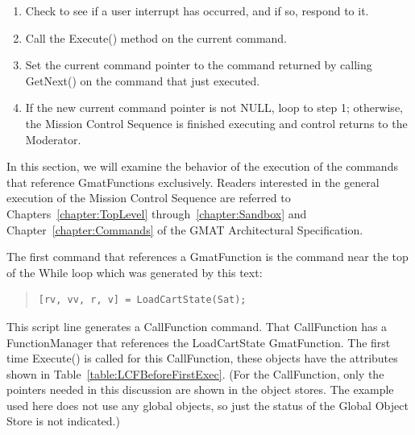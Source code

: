 \begin{enumerate}
\item Check to see if a user interrupt has occurred, and if so, respond to it.
\item Call the Execute() method on the current command.
\item Set the current command pointer to the command returned by calling GetNext() on the command
that just executed.
\item If the new current command pointer is not NULL, loop to step 1; otherwise, the Mission Control
Sequence is finished executing and control returns to the Moderator.
\end{enumerate}

In this section, we will examine the behavior of the execution of the commands that reference
GmatFunctions exclusively.  Readers interested in the general execution of the Mission Control
Sequence are referred to Chapters~\ref{chapter:TopLevel} through~\ref{chapter:Sandbox} and
Chapter~\ref{chapter:Commands} of the GMAT Architectural Specification.

The first command that references a GmatFunction is the command near the top of the While loop which
was generated by this text:

\begin{quote}
\begin{verbatim}
[rv, vv, r, v] = LoadCartState(Sat);
\end{verbatim}
\end{quote}

This script line generates a CallFunction command.  That CallFunction has a FunctionManager that
references the LoadCartState GmatFunction.  The first time Execute() is called for this
CallFunction, these objects have the attributes shown in Table~\ref{table:LCFBeforeFirstExec}.  (For
the CallFunction, only the pointers needed in this discussion are shown in the object stores.  The
example used here does not use any global objects, so just the status of the Global Object Store is
not indicated.)

